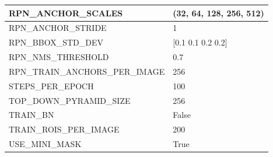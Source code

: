 \begin{longtable}[h]{|l|l|}
	RPN\_ANCHOR\_SCALES             & (32, 64, 128, 256, 512)                                                                                                                                                                \\ \hline
	RPN\_ANCHOR\_STRIDE             & 1                                                                                                                                                                                      \\ \hline
	RPN\_BBOX\_STD\_DEV             & {[}0.1 0.1 0.2 0.2{]}                                                                                                                                                                  \\ \hline
	RPN\_NMS\_THRESHOLD             & 0.7                                                                                                                                                                                    \\ \hline
	RPN\_TRAIN\_ANCHORS\_PER\_IMAGE & 256                                                                                                                                                                                    \\ \hline
	STEPS\_PER\_EPOCH               & 100                                                                                                                                                                                    \\ \hline
	TOP\_DOWN\_PYRAMID\_SIZE        & 256                                                                                                                                                                                    \\ \hline
	TRAIN\_BN                       & False                                                                                                                                                                                  \\ \hline
	TRAIN\_ROIS\_PER\_IMAGE         & 200                                                                                                                                                                                    \\ \hline
	USE\_MINI\_MASK                 & True                                                                                                                                                                                   \\ \hline

\end{longtable}
